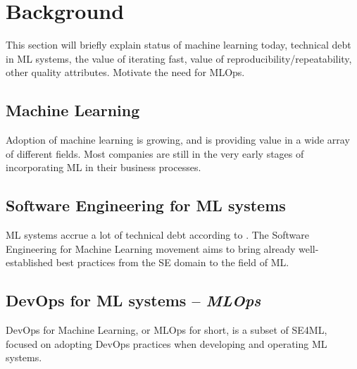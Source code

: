\chapter{Background}
This section will briefly explain status of machine learning today, technical debt in ML systems, the value of iterating fast, value of reproducibility/repeatability, other quality attributes.
Motivate the need for MLOps.

\section{Machine Learning}
Adoption of machine learning is growing, and is providing value in a wide array of different fields.
Most companies are still in the very early stages of incorporating ML in their business processes.

\section{Software Engineering for ML systems}
ML systems accrue a lot of technical debt according to \textcite{Sculley2015}.
The Software Engineering for Machine Learning movement aims to bring already well-established best practices from the SE domain to the field of ML.

\section{DevOps for ML systems -- \emph{MLOps}}
DevOps for Machine Learning, or MLOps for short, is a subset of SE4ML, focused on adopting DevOps practices when developing and operating ML systems.